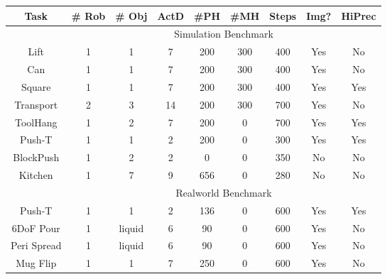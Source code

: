 \setlength\tabcolsep{2 pt}
\small
\begin{tabular}{c|cccccccc}
\toprule
Task      & \# Rob & \# Obj & ActD & \#PH & \#MH & Steps & Img? & HiPrec \\
\midrule
\multicolumn{1}{c}{} & \multicolumn{8}{c}{Simulation Benchmark} \\
\midrule
Lift      & 1      & 1      & 7    & 200   & 300   & 400       & Yes    & No       \\
Can       & 1      & 1      & 7    & 200   & 300   & 400       & Yes    & No       \\
Square    & 1      & 1      & 7    & 200   & 300   & 400       & Yes    & Yes      \\
Transport & 2      & 3      & 14   & 200   & 300   & 700       & Yes    & No       \\
ToolHang  & 1      & 2      & 7    & 200   & 0     & 700       & Yes    & Yes      \\
\midrule
Push-T    & 1      & 1      & 2    & 200   & 0     & 300       & Yes    & Yes      \\
\midrule
BlockPush & 1      & 2      & 2    & 0     & 0     & 350       & No     & No       \\
\midrule
Kitchen   & 1      & 7      & 9    & 656   & 0     & 280       & No     & No      \\
\midrule
\multicolumn{1}{c}{} & \multicolumn{8}{c}{Realworld Benchmark} \\
\midrule
Push-T    & 1      & 1      & 2    & 136   & 0     & 600       & Yes    & Yes  \\
6DoF Pour   & 1    & liquid      & 6    & 90   & 0     & 600       & Yes    & No  \\
Peri Spread   & 1      & liquid      & 6    & 90   & 0     & 600       & Yes    & No  \\
Mug Flip  & 1      & 1      & 7    & 250   & 0     & 600       & Yes    & No  \\
\bottomrule
\end{tabular}
